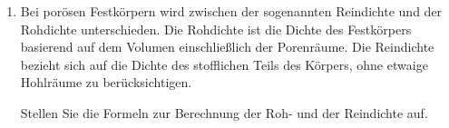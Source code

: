 \documentclass[a4paper,11pt]{article}
\newcommand{\fplmt}[1]{{\color{uniblau!75!black} \sffamily \bfseries #1}}
\newcommand{\antwort}[1]{
\begin{tcolorbox}[
	enhanced,
	enforce breakable,
	standard jigsaw,
	boxrule=0.7pt,
	colframe=black,
	sharp corners,
	boxsep=5pt,
	title=\bfseries \sffamily Antwort,
	opacityback=0,
	coltitle=miudiutex,
	attach boxed title to top text left={yshift=-\tcboxedtitleheight/2},
	boxed title style={colback=white,colframe=white},
	bottomrule at break=0pt,
	toprule at break=0pt,
	pad at break=16mm,
]
	\begin{center}
	#1
	\end{center}
	\end{tcolorbox}
}
\newif\ifshowme
\begin{document}
\begin{enumerate}[leftmargin=6mm,font={\bfseries \sffamily \color{uniblau!75!black}},label=\alph*)]
{
}











\color{miudiutex}
\ifshowme
\antwort{
In aufsteigender Reihenfolge: Fett, Wasser, Protein, Stärke, Salz
}
\pagebreak
\else
\fi

\item Bei porösen Festkörpern wird zwischen der sogenannten Reindichte und der Rohdichte unterschieden. Die Rohdichte ist die Dichte des Festkörpers basierend auf dem Volumen einschließlich der Porenräume. Die Reindichte bezieht sich auf die Dichte des stofflichen Teils des Körpers, ohne etwaige Hohlräume zu berücksichtigen. 
 
Stellen Sie die Formeln zur Berechnung der Roh- und der Reindichte auf.
\ifshowme
\antwort{
\vspace*{-4mm}
\begin{align*}
{\mathlarger \rho}_{roh} &= \frac{m}{V_{Stoff} + V_{por}} \\
{\mathlarger \rho}_{rein} &= \frac{m}{V_{Stoff}}
\end{align*}
$m$ : Masse des Festkörpers \par 
$V_{Stoff}$ : Volumen des Stoffes \par 
$ V_{por}$ : Volumen der Poren
}
\else
\fi




\end{enumerate}
\end{document}
